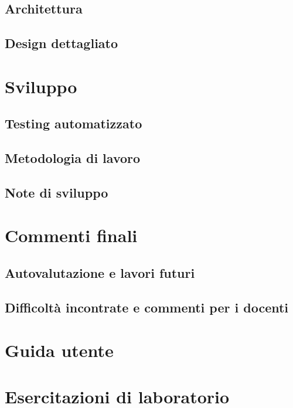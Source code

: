 \documentclass[a4paper,12pt]{report}
\begin{document}
	\section{Architettura}
	\section{Design dettagliato}
	\chapter{Sviluppo}
	\section{Testing automatizzato}
	\section{Metodologia di lavoro}
	\section{Note di sviluppo}
	\chapter{Commenti finali}
	\section{Autovalutazione e lavori futuri}
	\section{Difficoltà incontrate e commenti per i docenti}
	\appendix
	\chapter{Guida utente}
	\chapter{Esercitazioni di laboratorio}
	\printbibliography[heading=bibintoc]
\end{document}
